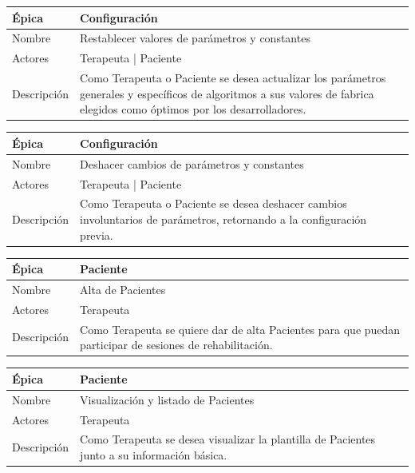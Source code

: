 \begin{table}[H] 
\centering
\begin{tabular}{| p{2cm} | p{10cm} |}
\hline
Épica & Configuración\\ \hline
Nombre & Restablecer valores de parámetros y constantes\\ \hline
Actores & Terapeuta | Paciente\\ \hline
Descripción & Como Terapeuta o Paciente se desea actualizar los parámetros generales y específicos de algoritmos a sus valores de fabrica elegidos como óptimos por los desarrolladores. \\ \hline
\end{tabular}
\end{table}

\begin{table}[H] 
\centering
\begin{tabular}{| p{2cm} | p{10cm} |}
\hline
Épica & Configuración\\ \hline
Nombre & Deshacer cambios de parámetros y constantes\\ \hline
Actores & Terapeuta | Paciente\\ \hline
Descripción & Como Terapeuta o Paciente se desea deshacer cambios involuntarios de parámetros, retornando a la configuración previa. \\ \hline
\end{tabular}
\end{table}

\begin{table}[H] 
\centering
\begin{tabular}{| p{2cm} | p{10cm} |}
\hline
Épica & Paciente\\ \hline
Nombre & Alta de Pacientes\\ \hline
Actores & Terapeuta\\ \hline
Descripción & Como Terapeuta se quiere dar de alta Pacientes para que puedan participar de sesiones de rehabilitación. \\ \hline
\end{tabular}
\end{table}

\begin{table}[H] 
\centering
\begin{tabular}{| p{2cm} | p{10cm} |}
\hline
Épica & Paciente\\ \hline
Nombre & Visualización y listado de Pacientes\\ \hline
Actores & Terapeuta\\ \hline
Descripción & Como Terapeuta se desea visualizar la plantilla de Pacientes junto a su información básica. \\ \hline
\end{tabular}
\end{table}

